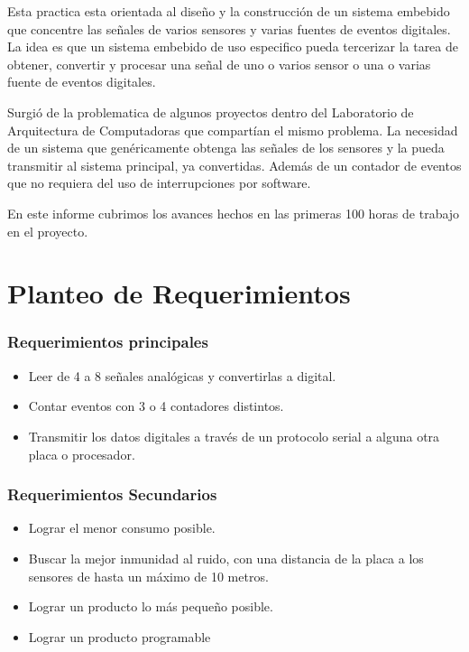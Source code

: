 \documentclass{article}
\theoremstyle{definition}
\theoremstyle{remark}
\begin{document}
Esta practica esta orientada al diseño y la construcción de un sistema embebido que concentre las señales de varios sensores y varias fuentes de eventos digitales. La idea es que un sistema embebido de uso especifico pueda tercerizar la tarea de obtener, convertir y procesar una señal de uno o varios sensor o una o varias fuente de eventos digitales.

Surgió de la problematica de algunos proyectos dentro del Laboratorio de Arquitectura de Computadoras que compartían el mismo problema. La necesidad de un sistema que genéricamente obtenga las señales de los sensores y la pueda transmitir al sistema principal, ya convertidas. Además de un contador de eventos que no requiera del uso de interrupciones por software.

En este informe cubrimos los avances hechos en las primeras 100 horas de trabajo en el proyecto.


\section{Planteo de Requerimientos} %
\label{sec:planteo_de_requerimientos}

\subsubsection{Requerimientos principales} %
\label{ssub:requerimientos_principales}

\begin{itemize}
  \item Leer de 4 a 8 señales analógicas y convertirlas a digital.
  \item Contar eventos con 3 o 4 contadores distintos.
  \item Transmitir los datos digitales a través de un protocolo serial a alguna otra placa o procesador.
\end{itemize}


\subsubsection{Requerimientos Secundarios} %
\label{ssub:requerimientos_secundarios}

\begin{itemize}
  \item Lograr el menor consumo posible.
  \item Buscar la mejor inmunidad al ruido, con una distancia de la placa a los sensores de hasta un máximo de 10 metros.
  \item Lograr un producto lo más pequeño posible.
  \item Lograr un producto programable
\end{itemize}
\end{document}
